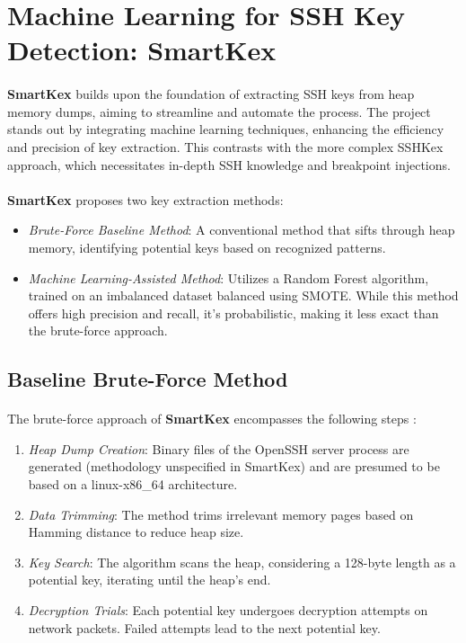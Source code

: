 \section{Machine Learning for SSH Key Detection: SmartKex}\label{sec:related_work:smartkex}

    \paragraph{}\textbf{SmartKex} builds upon the foundation of extracting SSH keys from heap memory dumps, aiming to streamline and automate the process. The project stands out by integrating machine learning techniques, enhancing the efficiency and precision of key extraction. This contrasts with the more complex SSHKex approach, which necessitates in-depth SSH knowledge and breakpoint injections.

    \paragraph{}\textbf{SmartKex} proposes two key extraction methods:
    \begin{itemize}
        \item \textit{Brute-Force Baseline Method}: A conventional method that sifts through heap memory, identifying potential keys based on recognized patterns.
        \item \textit{Machine Learning-Assisted Method}: Utilizes a Random Forest algorithm, trained on an imbalanced dataset balanced using SMOTE. While this method offers high precision and recall, it's probabilistic, making it less exact than the brute-force approach.
    \end{itemize}

    \subsection{Baseline Brute-Force Method}

    \paragraph{}The brute-force approach of \textbf{SmartKex} encompasses the following steps \cite{fellicious_smartkex_2022}:
    \begin{enumerate}
        \item \textit{Heap Dump Creation}: Binary files of the OpenSSH server process are generated (methodology unspecified in SmartKex) and are presumed to be based on a linux-x86\_64 architecture.
        \item \textit{Data Trimming}: The method trims irrelevant memory pages based on Hamming distance to reduce heap size.
        \item \textit{Key Search}: The algorithm scans the heap, considering a 128-byte length as a potential key, iterating until the heap's end.
        \item \textit{Decryption Trials}: Each potential key undergoes decryption attempts on network packets. Failed attempts lead to the next potential key.
    \end{enumerate}
